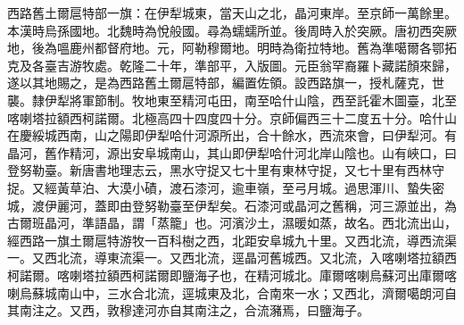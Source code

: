 \begin{pinyinscope}
西路舊土爾扈特部一旗：在伊犁城東，當天山之北，晶河東岸。至京師一萬餘里。本漢時烏孫國地。北魏時為悅般國。尋為蠕蠕所並。後周時入於突厥。唐初西突厥地，後為嗢鹿州都督府地。元，阿勒穆爾地。明時為衛拉特地。舊為準噶爾各鄂拓克及各臺吉游牧處。乾隆二十年，準部平，入版圖。元臣翁罕裔羅卜藏諾顏來歸，遂以其地賜之，是為西路舊土爾扈特部，編置佐領。設西路旗一，授札薩克，世襲。隸伊犁將軍節制。牧地東至精河屯田，南至哈什山陰，西至託霍木圖臺，北至喀喇塔拉額西柯諾爾。北極高四十四度四十分。京師偏西三十二度五十分。哈什山在慶綏城西南，山之陽即伊犁哈什河源所出，合十餘水，西流來會，曰伊犁河。有晶河，舊作精河，源出安阜城南山，其山即伊犁哈什河北岸山陰也。山有峽口，曰登努勒臺。新唐書地理志云，黑水守捉又七十里有東林守捉，又七十里有西林守捉。又經黃草泊、大漠小磧，渡石漆河，逾車嶺，至弓月城。過思渾川、蟄失密城，渡伊麗河，蓋即由登努勒臺至伊犁矣。石漆河或晶河之舊稱，河三源並出，為古爾班晶河，準語晶，謂「蒸籠」也。河濱沙土，濕暖如蒸，故名。西北流出山，經西路一旗土爾扈特游牧一百科樹之西，北距安阜城九十里。又西北流，導西流渠一。又西北流，導東流渠一。又西北流，逕晶河舊城西。又北流，入喀喇塔拉額西柯諾爾。喀喇塔拉額西柯諾爾即鹽海子也，在精河城北。庫爾喀喇烏蘇河出庫爾喀喇烏蘇城南山中，三水合北流，逕城東及北，合南來一水；又西北，濟爾噶朗河自其南注之。又西，敦穆達河亦自其南注之，合流瀦焉，曰鹽海子。


\end{pinyinscope}
